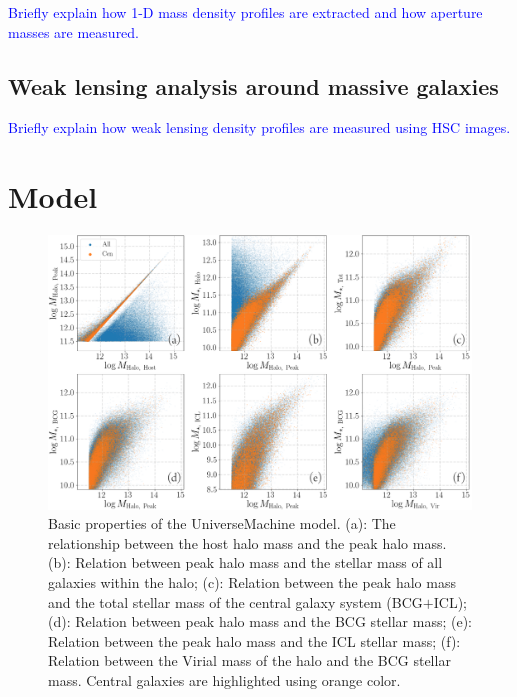 \documentclass[a4paper,fleqn,usenatbib]{mnras}
\newcommand{\plan}[1]{\textcolor{blue}{#1}}
\begin{document}
    \plan{Briefly explain how 1-D mass density profiles are extracted and how 
          aperture masses are measured.}
          
\subsection{Weak lensing analysis around massive galaxies}
    \label{ssec:wl}
    
    \plan{Briefly explain how weak lensing density profiles are measured using HSC 
          images.}


\section{Model}
    \label{sec:model}

    \begin{figure}
        \centering 
        \includegraphics[width=\textwidth]{fig/um2_halo}
            \caption{
                Basic properties of the UniverseMachine model.  
                (a): The relationship between the host halo mass and the peak halo mass. 
                (b): Relation between peak halo mass and the stellar mass of all 
                galaxies within the halo; 
                (c): Relation between the peak halo mass and the total stellar mass 
                of the central galaxy system (BCG$+$ICL); 
                (d): Relation between peak halo mass and the BCG stellar mass; 
                (e): Relation between the peak halo mass and the ICL stellar mass; 
                (f): Relation between the Virial mass of the halo and the BCG stellar 
                mass.  
                Central galaxies are highlighted using orange color.
                }
        \label{fig:um2_halo}
    \end{figure}
\end{document}
